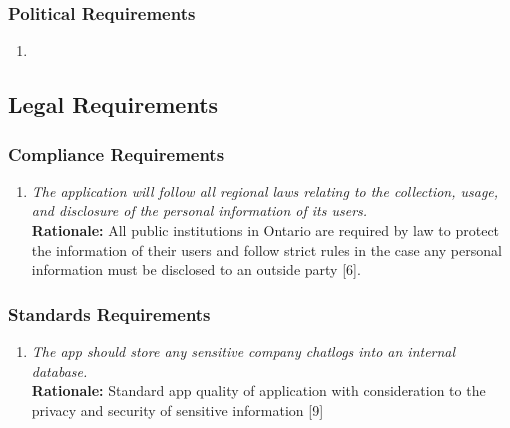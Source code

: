 \documentclass[]{article}
\begin{document}
\begin{enumerate}[{\bf BE1.}]
\subsubsection{Political Requirements}
\label{ssub:political_requirements}
\begin{enumerate}[{NA}]
    \item 
\end{enumerate}




\subsection{Legal Requirements}
\label{sub:legal_requirements}


\subsubsection{Compliance Requirements}
\label{ssub:compliance_requirements}
\begin{enumerate}[{LR-COMP}1. ]
    \item \emph{The application will follow all regional laws relating to the collection, usage, and disclosure of the personal information of its users.}\\
    {\bf Rationale:} All public institutions in Ontario are required by law to protect the information of their users and follow strict rules in the case any personal information must be disclosed to an outside party [6].
\end{enumerate}


\subsubsection{Standards Requirements}
\label{ssub:standards_requirements}
\begin{enumerate}[{LR-STD}1. ]
    \item \emph{The app should store any sensitive company chatlogs into an internal database.}\\
    {\bf Rationale:} Standard app quality of application with consideration to the privacy and security of sensitive information [9]
\end{enumerate}







\end{enumerate}
\end{document}

